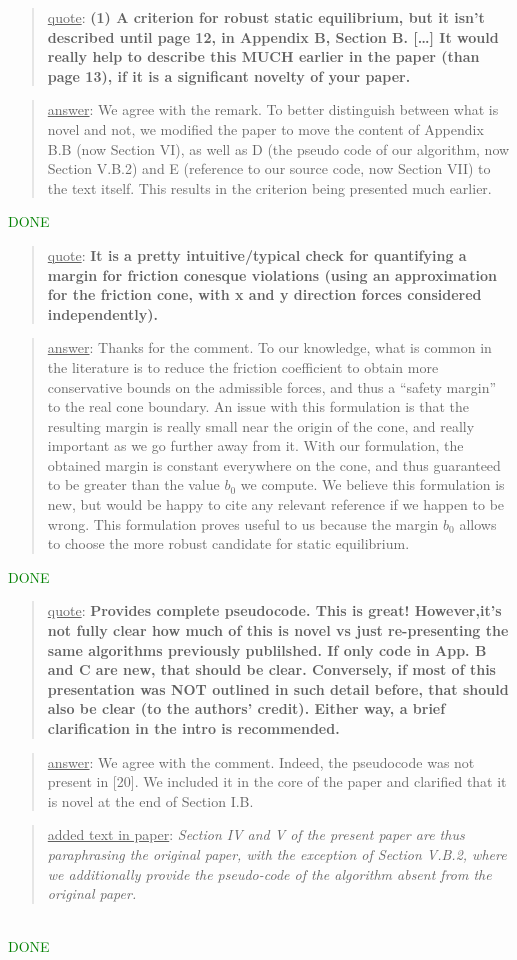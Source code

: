 \documentclass[a4paper]{article}
\newcommand{\done}[0]{\textcolor{green}{DONE}}
\newcommand\quot[1]{\begin{quote} \underline{quote}: \textbf{#1}\end{quote}}
\newcommand\as[1]{\begin{quote} \underline{answer}: {#1}\end{quote} }
\newcommand\qt[1]{\begin{quote} \underline{added text in paper}: \textit{#1}\end{quote} \leavevmode \\ }
\newcommand\jp{ \leavevmode \\}
\begin{document}
\quot { (1) A criterion for robust static equilibrium, but it isn't
described until page 12, in Appendix B, Section B. [\dots]  It would really help to describe this MUCH earlier in
the paper (than page 13), if it is a significant novelty of your paper.}

\as{We agree with the remark. To better distinguish between what is novel and not, we modified the paper to move the content of Appendix B.B (now Section VI), as well as D  (the pseudo code of our algorithm, now Section V.B.2) and E (reference to our source code, now Section VII) to the text itself. This results in the criterion being presented much earlier.}\done \jp

\quot{It is a pretty intuitive/typical check for quantifying a
margin for friction conesque violations (using an approximation for
the friction cone, with x and y direction forces considered
independently). }

\as{Thanks for the comment. To our knowledge, what is common in the literature is to reduce the friction coefficient to obtain more conservative bounds on the admissible forces, and thus a ``safety margin'' to the real cone boundary. An issue with this formulation is that the resulting margin is really small near the origin of the cone, and really important as we go further away from it. With our formulation, the obtained margin is constant everywhere on the cone, and thus guaranteed to be greater than the value $b_0$ we compute. We believe this formulation is new, but would be happy to cite any relevant reference if we happen to be wrong. This formulation proves useful to us because the margin $b_0$ allows to choose the more robust candidate for static equilibrium.}\done

\quot{
Provides complete pseudocode.  This is great! However,it's
not fully clear how much of this is novel vs just re-presenting the
same algorithms previously publilshed.	If only code in App. B and C
are new, that should be clear. Conversely, if most of this presentation
was NOT outlined in such detail before, that should also be clear (to
the authors' credit). Either way, a brief clarification in the intro is
recommended.}

\as{We agree with the comment. Indeed, the pseudocode was not present in [20]. We included it in the core of the paper and clarified that it is novel at the end
of Section I.B.}
\qt{Section IV and V of the present paper are thus paraphrasing the original paper, with the exception of Section V.B.2, where we additionally provide the pseudo-code of the algorithm absent from the original paper.}
\done
\end{document}
